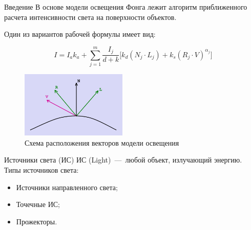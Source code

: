 \documentclass{beamer}
\begin{document}
	\begin{frame}{Введение}
		В основе модели освещения Фонга лежит алгоритм приближенного расчета интенсивности света на поверхности объектов. 

		Один из вариантов рабочей формулы имеет вид:

		\[
			I = I_a k_a + \sum_{j=1}^{m} \frac{I_{j}}{d+k} \bigg[ k_d (N_j \cdot L_j) + k_s (R_j \cdot V)^{\alpha_j} \bigg]
		\]

		\begin{figure} 
			\includegraphics[width=0.45\textwidth]{images/specular_light.png}
			\caption{Схема расположения векторов модели освещения}
		\end{figure}



	\end{frame}

	\begin{frame}{Источники света (ИС)}
		ИС (Light)~---~любой объект, излучающий энергию. \\
		Типы источников света:
		\begin{itemize}
			\item Источники направленного света;
			\item Точечные ИС;
			\item Прожекторы.
		\end{itemize}
		\note{
		}

	\end{frame}
	\fi
\end{document}
